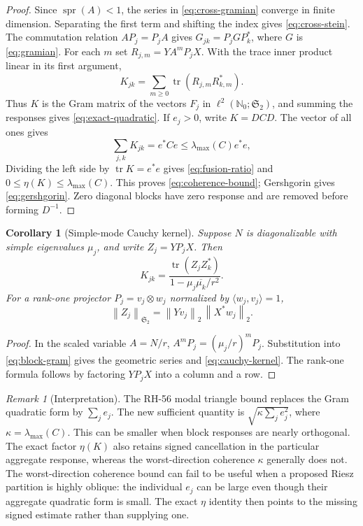 \documentclass[11pt]{article}
\newtheorem{corollary}[theorem]{Corollary}
\theoremstyle{remark}
\newtheorem{remark}[theorem]{Remark}
\newcommand{\norm}[1]{\left\lVert#1\right\rVert}
\newcommand{\HS}{\mathfrak S_2}
\newcommand{\tr}{\operatorname{tr}}
\newcommand{\spr}{\operatorname{spr}}
\begin{document}
\begin{proof}
Since $\spr(A)<1$, the series in \eqref{eq:cross-gramian} converge in finite
dimension.  Separating the first term and shifting the index gives
\eqref{eq:cross-stein}.  The commutation relation $AP_j=P_jA$ gives
\(G_{jk}=P_jGP_k^*\), where $G$ is \eqref{eq:gramian}.  For each $m$ set
$R_{j,m}=YA^mP_jX$.  With the trace inner product linear in its first
argument,
\[
 K_{jk}=\sum_{m\ge0}\tr(R_{j,m}R_{k,m}^*).
\]
Thus $K$ is the Gram matrix of the vectors $F_j$ in
$\ell^2(\mathbb N_0;\HS)$, and summing the responses gives
\eqref{eq:exact-quadratic}.  If $e_j>0$, write $K=DCD$.  The vector of all
ones gives
\[
 \sum_{j,k}K_{jk}=e^*Ce\le\lambda_{\max}(C)e^*e,
\]
Dividing the left side by $\tr K=e^*e$ gives \eqref{eq:fusion-ratio} and
$0\le\eta(K)\le\lambda_{\max}(C)$.  This proves
\eqref{eq:coherence-bound}; Gershgorin gives
\eqref{eq:gershgorin}.  Zero diagonal blocks have zero response and are
removed before forming $D^{-1}$.
\end{proof}

\begin{corollary}[Simple-mode Cauchy kernel]
\label{cor:cauchy}
Suppose $N$ is diagonalizable with simple eigenvalues $\mu_j$, and write
$Z_j=YP_jX$.  Then
\begin{equation}
 \boxed{K_{jk}=\frac{\tr(Z_jZ_k^*)}
 {1-\mu_j\overline{\mu_k}/r^2}.}
 \label{eq:cauchy-kernel}
\end{equation}
For a rank-one projector $P_j=v_j\otimes w_j$ normalized by
$\langle w_j,v_j\rangle=1$,
\begin{equation}
 \norm{Z_j}_{\HS}=\norm{Yv_j}_2\,\norm{X^*w_j}_2.
 \label{eq:rank-one-overlap}
\end{equation}
\end{corollary}

\begin{proof}
In the scaled variable $A=N/r$, $A^mP_j=(\mu_j/r)^mP_j$.
Substitution into \eqref{eq:block-gram} gives the geometric series and
\eqref{eq:cauchy-kernel}.  The rank-one formula follows by factoring
$YP_jX$ into a column and a row.
\end{proof}

\begin{remark}[Interpretation]
The RH-56 modal triangle bound replaces the Gram quadratic form by
\(\sum_j e_j\).  The new sufficient quantity is
\(\sqrt{\kappa\sum_j e_j^2}\), where $\kappa=\lambda_{\max}(C)$.
This can be smaller when block responses are nearly orthogonal.  The exact
factor $\eta(K)$ also retains signed cancellation in the particular aggregate
response, whereas the worst-direction coherence $\kappa$ generally does not.
The worst-direction coherence bound can fail to be useful when a proposed
Riesz partition is highly oblique: the individual $e_j$ can be large even
though their aggregate quadratic form is small.  The exact $\eta$ identity
then points to the missing signed estimate rather than supplying one.
\end{remark}
\end{document}
